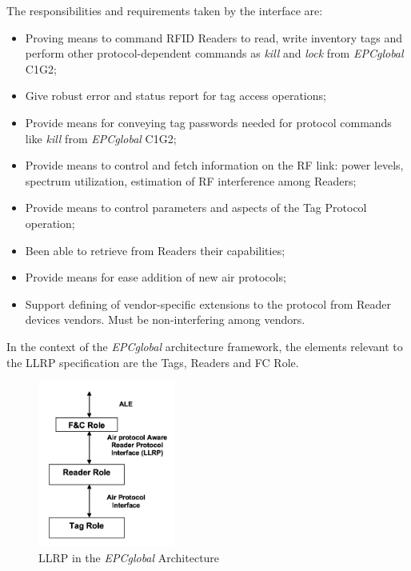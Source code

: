 The responsibilities and requirements taken by the interface are:

\begin{itemize}
    \setlength{\parskip}{0pt}
    \setlength{\itemsep}{0pt}
    \item Proving means to command \gls{RFID} Readers to read, write inventory tags and perform other protocol-dependent commands as \emph{kill} and \emph{lock} from \emph{EPCglobal} \gls{C1G2};
    \item Give robust error and status report for tag access operations;
    \item Provide means for conveying tag passwords needed for protocol commands like \emph{kill} from \emph{EPCglobal} \gls{C1G2};
    \item Provide means to control and fetch information on the \gls{RF} link: power levels, spectrum utilization, estimation of \gls{RF} interference among Readers;
    \item Provide means to control parameters and aspects of the Tag Protocol operation;
    \item Been able to retrieve from Readers their capabilities;
    \item Provide means for ease addition of new air protocols;
    \item Support defining of vendor-specific extensions to the protocol from Reader devices vendors. Must be non-interfering  among vendors.
\end{itemize}

In the context of the \emph{EPCglobal} architecture framework, the elements relevant to the LLRP specification are the Tags, Readers and \gls{FC} Role.

\begin{figure}[!ht]
    \centering
    \includegraphics[width=0.4\textwidth]{./assets/02-state-of-the-art/llrp-interaction}
    \caption{\gls{LLRP} in the \emph{EPCglobal} Architecture~\cite{Llrp1standard20101013Pdf}} 
    \label{fig:02:llrp-interaction}
\end{figure}

